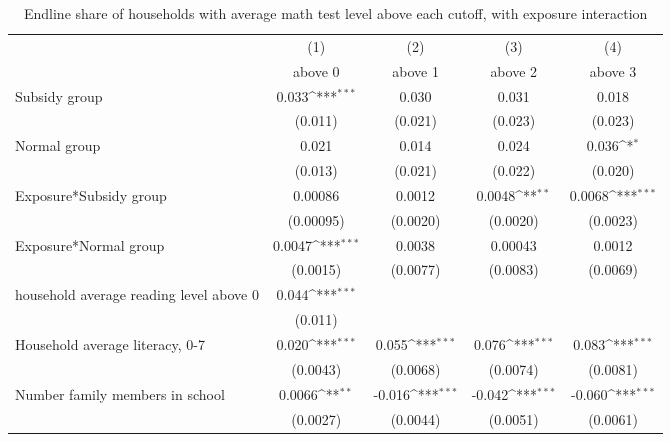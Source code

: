 \begin{table}[htbp]\centering
\def\sym#1{\ifmmode^{#1}\else\(^{#1}\)\fi}
\caption{Endline share of households with average math test level above each cutoff, with exposure interaction}
\begin{tabular*}{1\hsize}{@{\hskip\tabcolsep\extracolsep\fill}l*{4}{c}}
\toprule
                &\multicolumn{1}{c}{(1)}&\multicolumn{1}{c}{(2)}&\multicolumn{1}{c}{(3)}&\multicolumn{1}{c}{(4)}\\
                &\multicolumn{1}{c}{above 0}&\multicolumn{1}{c}{above 1}&\multicolumn{1}{c}{above 2}&\multicolumn{1}{c}{above 3}\\
\midrule
Subsidy group   &    0.033\sym{***}&    0.030         &    0.031         &    0.018         \\
                &  (0.011)         &  (0.021)         &  (0.023)         &  (0.023)         \\
Normal group    &    0.021         &    0.014         &    0.024         &    0.036\sym{*}  \\
                &  (0.013)         &  (0.021)         &  (0.022)         &  (0.020)         \\
Exposure*Subsidy group&  0.00086         &   0.0012         &   0.0048\sym{**} &   0.0068\sym{***}\\
                &(0.00095)         & (0.0020)         & (0.0020)         & (0.0023)         \\
Exposure*Normal group&   0.0047\sym{***}&   0.0038         &  0.00043         &   0.0012         \\
                & (0.0015)         & (0.0077)         & (0.0083)         & (0.0069)         \\
household average reading level above 0&    0.044\sym{***}&                  &                  &                  \\
                &  (0.011)         &                  &                  &                  \\
Household average literacy, 0-7&    0.020\sym{***}&    0.055\sym{***}&    0.076\sym{***}&    0.083\sym{***}\\
                & (0.0043)         & (0.0068)         & (0.0074)         & (0.0081)         \\
Number family members in school&   0.0066\sym{**} &   -0.016\sym{***}&   -0.042\sym{***}&   -0.060\sym{***}\\
                & (0.0027)         & (0.0044)         & (0.0051)         & (0.0061)         \\

\end{tabular*}
\end{table}
